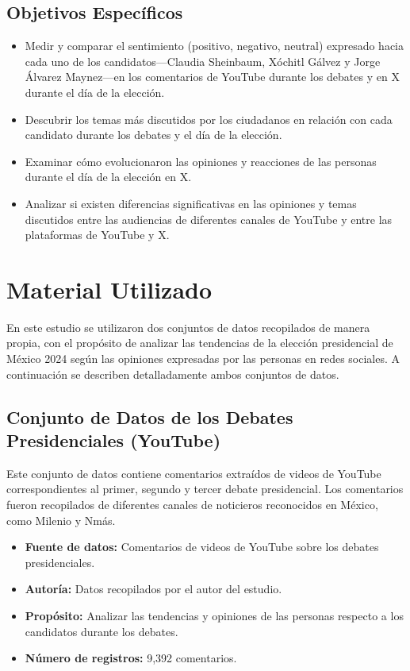 \documentclass[10pt, a4paper]{article}
\begin{document}
    \subsection{Objetivos Específicos}
    \begin{itemize}
    	\item Medir y comparar el sentimiento (positivo, negativo, neutral) expresado hacia cada uno de los candidatos—Claudia Sheinbaum, Xóchitl Gálvez y Jorge Álvarez Maynez—en los comentarios de YouTube durante los debates y en X durante el día de la elección.
    	\item  Descubrir los temas más discutidos por los ciudadanos en relación con cada candidato durante los debates y el día de la elección.
    	\item Examinar cómo evolucionaron las opiniones y reacciones de las personas durante el día de la elección en X.
    	\item Analizar si existen diferencias significativas en las opiniones y temas discutidos entre las audiencias de diferentes canales de YouTube y entre las plataformas de YouTube y X.
    \end{itemize}

    \section{Material Utilizado}
    
    En este estudio se utilizaron dos conjuntos de datos recopilados de manera propia, con el propósito de analizar las tendencias de la elección presidencial de México 2024 según las opiniones expresadas por las personas en redes sociales. A continuación se describen detalladamente ambos conjuntos de datos.
    
    \subsection{Conjunto de Datos de los Debates Presidenciales (YouTube)}
    
    Este conjunto de datos contiene comentarios extraídos de videos de YouTube correspondientes al primer, segundo y tercer debate presidencial. Los comentarios fueron recopilados de diferentes canales de noticieros reconocidos en México, como Milenio y Nmás.
    
    \begin{itemize}
    	\item \textbf{Fuente de datos:} Comentarios de videos de YouTube sobre los debates presidenciales.
    	\item \textbf{Autoría:} Datos recopilados por el autor del estudio.
    	\item \textbf{Propósito:} Analizar las tendencias y opiniones de las personas respecto a los candidatos durante los debates.
    	\item \textbf{Número de registros:} 9,392 comentarios.
    \end{itemize}
    
\end{document}
